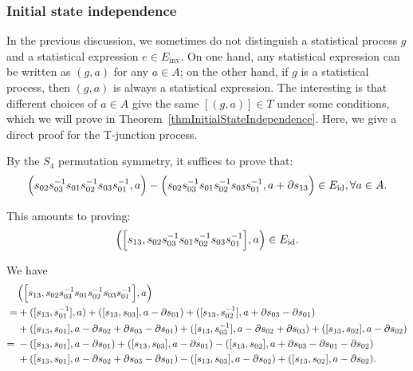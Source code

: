 \documentclass[reprint, amsmath, amssymb, showpacs, floatfix, longbibliography, aps, twocolumn, superscriptaddress, nofootinbib]{revtex4-2}
\newcommand{\inv}{{\operatorname{inv}}}
\theoremstyle{definition}
\begin{document}
\begin{widetext}
\subsubsection{Initial state independence}

	In the previous discussion, we sometimes do not distinguish a statistical process $g$ and a statistical expression $e\in E_\inv$. On one hand, any statistical expression can be written as $(g,a)$ for any $a\in A$; on the other hand, if $g$ is a statistical process, then $(g,a)$ is always a statistical expression. The interesting is that different choices of $a\in A$ give the same $[(g,a)]\in T$ under some conditions, which we will prove in Theorem~\ref{thmInitialStateIndependence}. Here, we give a direct proof for the T-junction process.
	 
	 By the $S_4$ permutation symmetry, it suffices to prove that:
	\begin{equation}\label{eqInitialStateIndependenceSecFive}
		\Bigl(s_{02} s_{03}^{-1} s_{01} s_{02}^{-1} s_{03} s_{01}^{-1}, a\Bigr) - \Bigl(s_{02} s_{03}^{-1} s_{01} s_{02}^{-1} s_{03} s_{01}^{-1}, a + \partial s_{13}\Bigr) \in E_{\operatorname{id}}, \forall a \in A.
	\end{equation}
	
	This amounts to proving:
	\begin{equation}
		\Bigl(\Bigl[s_{13}, s_{02} s_{03}^{-1} s_{01} s_{02}^{-1} s_{03} s_{01}^{-1}\Bigr], a\Bigr) \in E_{\operatorname{id}}.
	\end{equation}
	
	We have 
	\begin{equation}
		\begin{aligned}
			&\Bigl(\Bigl[s_{13}, s_{02} s_{03}^{-1} s_{01} s_{02}^{-1} s_{03} s_{01}^{-1}\Bigr], a\Bigr)\\=&+([s_{13}, s_{01}^{-1}],a)+([s_{13},s_{03}],a-\partial s_{01})+([s_{13},s_{02}^{-1}],a+\partial s_{03}-\partial s_{01})\\&+([s_{13},s_{01}],a-\partial s_{02}+\partial s_{03}-\partial s_{01})+([s_{13},s_{03}^{-1}],a-\partial s_{02}+\partial s_{03})+([s_{13},s_{02}],a-\partial s_{02})\\=\;&-([s_{13}, s_{01}],a-\partial s_{01})+([s_{13},s_{03}],a-\partial s_{01})-([s_{13},s_{02}],a+\partial s_{03}-\partial s_{01}-\partial s_{02})\\
		&+([s_{13},s_{01}],a-\partial s_{02}+\partial s_{03}-\partial s_{01})-([s_{13},s_{03}],a-\partial s_{02})+([s_{13},s_{02}],a-\partial s_{02}).
		\end{aligned}
	\end{equation}
	

\end{widetext}
\end{document}

